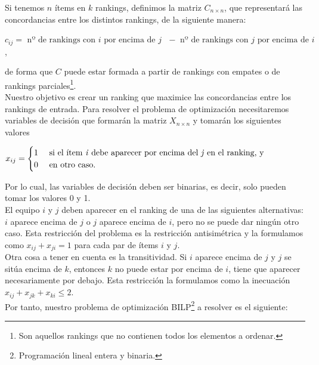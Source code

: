 Si tenemos $n$ ítems en $k$ rankings, definimos la matriz $C_{n \times n}$, que representará las concordancias entre los distintos rankings, de la siguiente manera:
\begin{center}
	$c_{ij} = \text{ nº de rankings con }i \text{ por encima de } j \text{ } -  \text{ nº de rankings con }j \text{ por encima de } i \text{ }$,
\end{center}

de forma que $C$ puede estar formada a partir de rankings con empates o de rankings parciales\footnote{Son aquellos rankings que no contienen todos los elementos a ordenar.}.\\

Nuestro objetivo es crear un ranking que maximice las concordancias entre los rankings de entrada. Para resolver el problema de optimización necesitaremos variables de decisión que formarán la matriz $X_{n \times n}$ y tomarán los siguientes valores
\begin{center}
	$ x_{ij} =  \begin{cases}
1 & \text{ si el ítem \textit{i} debe aparecer por encima del \textit{j} en el ranking, y} \\
0 & \text{ en otro caso. } 
\end{cases}$
\end{center}
Por lo cual, las variables de decisión deben ser binarias, es decir, solo pueden tomar los valores 0 y 1.\\

El equipo $i$ y $j$ deben aparecer en el ranking de una de las siguientes alternativas: $i$ aparece encima de $j$ o $j$ aparece encima de $i$, pero no se puede dar ningún otro caso. Esta restricción del problema es la restricción antisimétrica y la formulamos como $x_{ij} + x_{ji} = 1$ para cada par de ítems $i$ y $j$.\\

Otra cosa a tener en cuenta es la transitividad. Si $i$ aparece encima de $j$ y $j$ se sitúa encima de $k$, entonces $k$ no puede estar por encima de $i$, tiene que aparecer necesariamente por debajo. Esta restricción la formulamos como la inecuación $x_{ij} + x_{jk} + x_{ki} \leq 2$.\\


Por tanto, nuestro problema de optimización BILP\footnote{Programación lineal entera y binaria.} a resolver es el siguiente:\\

